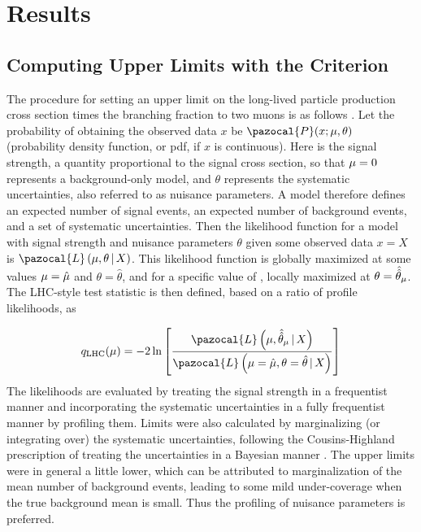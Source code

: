 \section{Results}
\subsection{Computing Upper Limits with the \CLs Criterion}
\label{sec:dd:cls}
The procedure for setting an upper limit on the long-lived particle production cross section times the branching fraction to two muons is as follows \cite{CMS-NOTE-2011-005}.
Let the probability of obtaining the observed data $x$ be $\pazocal{P}(x; \sigstr, \theta)$ (probability density function, or pdf, if $x$ is continuous).
Here \sigstr is the signal strength, a quantity proportional to the signal cross section, so that $\mu = 0$ represents a background-only model, and $\theta$ represents the systematic uncertainties, also referred to as nuisance parameters.
A model therefore defines an expected number of signal events, an expected number of background events, and a set of systematic uncertainties.
Then the likelihood function for a model with signal strength \sigstr and nuisance parameters $\theta$ given some observed data $x = X$ is $\pazocal{L}\left(\sigstr, \theta \,\vert\, X\right)$.
This likelihood function is globally maximized at some values $\mu = \hat{\mu}$ and $\theta = \hat{\theta}$, and for a specific value of \sigstr, locally maximized at $\theta = \hat{\hat{\theta}}_\mu$.
The LHC-style test statistic \cite{CombineManual} is then defined, based on a ratio of profile likelihoods, as

\begin{equation}
  q_\text{LHC}(\sigstr) = -2\ln\left[\frac{\pazocal{L}\left(\sigstr, \hat{\hat{\theta}}_\sigstr \,\vert\, X\right)}{\pazocal{L}\left(\sigstr = \hat{\sigstr}, \theta=\hat{\theta}\,\vert\,  X\right)}\right]
  \label{eq:dd:qLHC}
\end{equation}
The likelihoods are evaluated by treating the signal strength in a frequentist manner and incorporating the systematic uncertainties in a fully frequentist manner by profiling them.
Limits were also calculated by marginalizing (or integrating over) the systematic uncertainties, following the Cousins-Highland prescription of treating the uncertainties in a Bayesian manner \cite{CousinsHighland:SystUnc1992}.
The upper limits were in general a little lower, which can be attributed to marginalization of the mean number of background events, leading to some mild under-coverage when the true background mean is small.
Thus the profiling of nuisance parameters is preferred.

